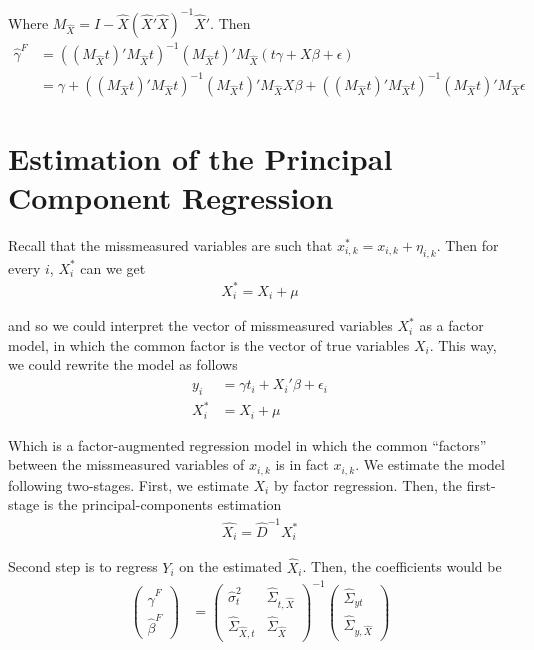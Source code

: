 \documentclass[12pt]{article}
\def\g{\gamma}
\begin{document}
Where $M_{\hat{X}}=I-\hat{X}(\hat{X}'\hat{X})^{-1}\hat{X}'$. Then
\begin{align}
     \hat{\g}^F & = ((M_{\hat{X}}t)'M_{\hat{X}}t)^{-1}(M_{\hat{X}}t)'M_{\hat{X}}(t\gamma  + X\beta + \epsilon) \\
     &=\gamma +((M_{\hat{X}}t)'M_{\hat{X}}t)^{-1}(M_{\hat{X}}t)'M_{\hat{X}}X\beta+((M_{\hat{X}}t)'M_{\hat{X}}t)^{-1}(M_{\hat{X}}t)'M_{\hat{X}}\epsilon
\end{align}

\section*{Estimation of the Principal Component Regression}

Recall that the missmeasured variables are such that $x^*_{i,k}=x_{i,k}+\eta_{i,k}$. Then for every $i$, $X_i^*$ can we get
\begin{align}
    X_i^* = X_i +\mu
\end{align}

and so we could interpret the vector of missmeasured variables $X^*_i$ as a factor model, in which the common factor is the vector of true variables $X_i$. This way, we could rewrite the model as follows
\begin{align}
    y_i &= \gamma t_i + X_i'\beta + \epsilon_i \\
    X_i^* &= X_i +\mu
\end{align}

Which is a factor-augmented regression model in which the common ``factors'' between the missmeasured variables of $x_{i,k}$ is in fact $x_{i,k}$. We estimate the model following two-stages. First, we estimate $X_i$ by factor regression. Then, the first-stage is the principal-components estimation
\begin{align}
    \hat{X_i}=\hat{D}^{-1}X_i^*
\end{align}

Second step is to regress $Y_i$ on the estimated $\hat X_i$. Then, the coefficients would be
\begin{align}
    \left(\begin{array}{l}
\hat{\gamma}^{F} \\
\hat{\beta}^{F}
\end{array}\right)&=\left(\begin{array}{cc}
\hat{\sigma}^2_{t} & \hat\Sigma_{t,\hat X} \\
\hat \Sigma_{\hat X,t} & \hat {\Sigma}_{\hat X}
\end{array}\right)^{-1}\left(\begin{array}{c}
\hat \Sigma_{yt} \\
\hat \Sigma_{y,\hat X}
\end{array}\right)
\end{align}
\end{document}
